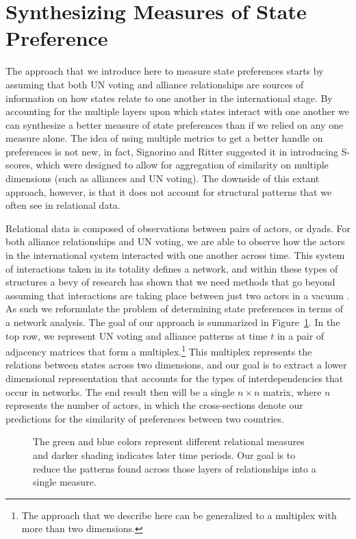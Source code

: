 \section*{Synthesizing Measures of State Preference}

The approach that we introduce here to measure state preferences starts by assuming that both UN voting and alliance relationships are sources of information on how states relate to one another in the international stage. By accounting for the multiple layers upon which states interact with one another we can synthesize a better measure of state preferences than if we relied on any one measure alone. The idea of using multiple metrics to get a better handle on preferences is not new, in fact, Signorino and Ritter suggested it in introducing S-scores, which were designed to allow for aggregation of similarity on multiple dimensions (such as alliances and UN voting). The downside of this extant approach, however, is that it does not account for structural patterns that we often see in relational data. 

Relational data is composed of observations between pairs of actors, or dyads. For both alliance relationships and UN voting, we are able to observe how the actors in the international system  interacted with one another across time. This system of interactions taken in its totality defines a network, and within these types of structures a bevy of research has shown that we need methods that go beyond assuming that interactions are taking place between just two actors in a vacuum \citep{wasserman:faust:1994,snijders:nowicki:1997}. As such we reformulate the problem of determining state preferences in terms of a network analysis. The goal of our approach is summarized in Figure~\ref{fig:tensViz}. In the top row, we represent UN voting and alliance patterns at time $t$ in a pair of adjacency matrices that form a multiplex.\footnote{The approach that we describe here can be generalized to a multiplex with more than two dimensions.} This multiplex represents the relations between states across two dimensions, and our goal is to extract a lower dimensional representation that accounts for the types of interdependencies that occur in networks. The end result then will be a single $n \times n$ matrix, where $n$ represents the number of actors, in which the cross-sections denote our predictions for the similarity of preferences between two countries.

\begin{figure}[ht]
	\centering
	\resizebox{.8\textwidth}{!}{}
	\caption{The green and blue colors represent different relational measures and darker shading indicates later time periods. Our goal is to reduce the patterns found across those layers of relationships into a single measure.}
	\label{fig:tensViz}
\end{figure}

